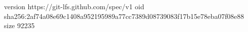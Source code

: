 version https://git-lfs.github.com/spec/v1
oid sha256:2af74a08e69c1408a952195989a77cc7389d08739083f17b15e78eba07f08e88
size 92235
